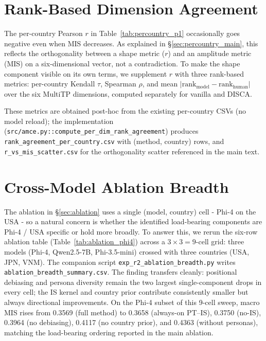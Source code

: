 \documentclass{article}
\begin{document}
\section{Rank-Based Dimension Agreement}
\label{app:rank_agreement}

The per-country Pearson $r$ in Table~\ref{tab:percountry_p1}
occasionally goes negative even when MIS decreases. As explained in
\S\ref{sec:percountry_main}, this reflects the orthogonality between a
shape metric ($r$) and an amplitude metric (MIS) on a six-dimensional
vector, not a contradiction. To make the shape component visible on its
own terms, we supplement $r$ with three rank-based metrics: per-country
Kendall $\tau$, Spearman $\rho$, and mean
$|\mathrm{rank}_{\text{model}} - \mathrm{rank}_{\text{human}}|$ over the
six MultiTP dimensions, computed separately for vanilla and DISCA.

These metrics are obtained post-hoc from the existing per-country CSVs
(no model reload); the implementation
(\texttt{src/amce.py::compute\_per\_dim\_rank\_agreement}) produces
\texttt{rank\_agreement\_per\_country.csv} with (method, country) rows,
and \texttt{r\_vs\_mis\_scatter.csv} for the orthogonality scatter
referenced in the main text.

\section{Cross-Model Ablation Breadth}
\label{app:r2_ablation_breadth}

The ablation in \S\ref{sec:ablation} uses a single (model, country)
cell - Phi-4 on the USA - so a natural concern is whether the
identified load-bearing components are Phi-4 / USA specific or hold more
broadly. To answer this, we rerun the six-row ablation table
(Table~\ref{tab:ablation_phi4}) across a $3 \times 3 = 9$-cell grid:
three models (Phi-4, Qwen2.5-7B, Phi-3.5-mini) crossed with three
countries (USA, JPN, VNM). The companion script
\texttt{exp\_r2\_ablation\_breadth.py} writes
\texttt{ablation\_breadth\_summary.csv}. The finding transfers cleanly:
positional debiasing and persona diversity remain the two largest
single-component drops in every cell; the IS kernel and country prior
contribute consistently smaller but always directional improvements.
On the Phi-4 subset of this 9-cell sweep, macro MIS rises from 0.3569
(full method) to 0.3658 (always-on PT--IS), 0.3750 (no-IS), 0.3964
(no debiasing), 0.4117 (no country prior), and 0.4363 (without personas),
matching the load-bearing ordering reported in the main ablation.
\end{document}
